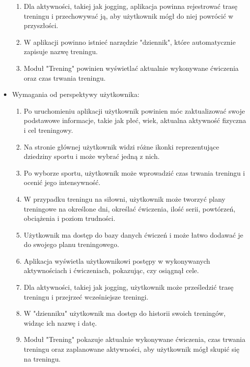 \begin{itemize}
\begin{enumerate}
       \item Dla aktywności, takiej jak jogging, aplikacja powinna rejestrować trasę treningu i przechowywać ją, aby użytkownik mógł do niej powrócić w przyszłości.

       \item W aplikacji powinno istnieć narzędzie "dziennik", które automatycznie zapisuje nazwę treningu.

       \item Moduł "Trening" powinien wyświetlać aktualnie wykonywane ćwiczenia oraz czas trwania treningu.

    \end{enumerate}
    \newpage
    \item Wymagania od perspektywy użytkownika:
    \begin{enumerate}
        \item Po uruchomieniu aplikacji użytkownik powinien móc zaktualizować swoje podstawowe informacje, takie jak płeć, wiek, aktualna aktywność fizyczna i cel treningowy.

        \item Na stronie głównej użytkownik widzi różne ikonki reprezentujące dziedziny sportu i może wybrać jedną z nich.

        \item Po wyborze sportu, użytkownik może wprowadzić czas trwania treningu i ocenić jego intensywność.

        \item W przypadku treningu na siłowni, użytkownik może tworzyć plany treningowe na określone dni, określać ćwiczenia, ilość serii, powtórzeń, obciążenia i poziom trudności.

        \item Użytkownik ma dostęp do bazy danych ćwiczeń i może łatwo dodawać je do swojego planu treningowego.

        \item Aplikacja wyświetla użytkownikowi postępy w wykonywanych aktywnościach i ćwiczeniach, pokazując, czy osiągnął cele.

        \item Dla aktywności, takiej jak jogging, użytkownik może prześledzić trasę treningu i przejrzeć wcześniejsze treningi.

        \item W "dzienniku" użytkownik ma dostęp do historii swoich treningów, widząc ich nazwę i datę.

        \item Moduł "Trening" pokazuje aktualnie wykonywane ćwiczenia, czas trwania treningu oraz zaplanowane aktywności, aby użytkownik mógł skupić się na treningu.
    \end{enumerate}
\end{itemize}
 

